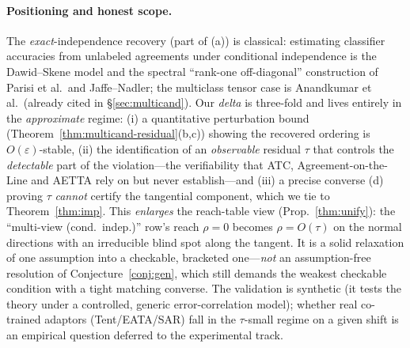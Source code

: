\paragraph{Positioning and honest scope.} The \emph{exact}-independence recovery
(part of (a)) is classical: estimating classifier accuracies from unlabeled
agreements under conditional independence is the Dawid--Skene model and the
spectral ``rank-one off-diagonal'' construction of Parisi et al.\ and
Jaffe--Nadler; the multiclass tensor case is Anandkumar et al.\ (already cited in
\S\ref{sec:multicand}). Our \emph{delta} is three-fold and lives entirely in the
\emph{approximate} regime: (i) a quantitative perturbation bound
(Theorem~\ref{thm:multicand-residual}(b,c)) showing the recovered ordering is
$O(\varepsilon)$-stable, (ii) the identification of an \emph{observable} residual
$\tau$ that controls the \emph{detectable} part of the violation---the
verifiability that ATC, Agreement-on-the-Line and AETTA rely on but never
establish---and (iii) a precise converse (d) proving $\tau$ \emph{cannot}
certify the tangential component, which we tie to Theorem~\ref{thm:imp}. This
\emph{enlarges} the reach-table view (Prop.~\ref{thm:unify}): the
``multi-view (cond.\ indep.)'' row's reach $\rho{=}0$ becomes $\rho=O(\tau)$ on
the normal directions with an irreducible blind spot along the tangent. It is a
solid relaxation of one assumption into a checkable, bracketed one---\emph{not} an
assumption-free resolution of Conjecture~\ref{conj:gen}, which still demands the
weakest checkable condition with a tight matching converse. The validation is
synthetic (it tests the theory under a controlled, generic error-correlation
model); whether real co-trained adaptors (Tent/EATA/SAR) fall in the $\tau$-small
regime on a given shift is an empirical question deferred to the experimental
track.
